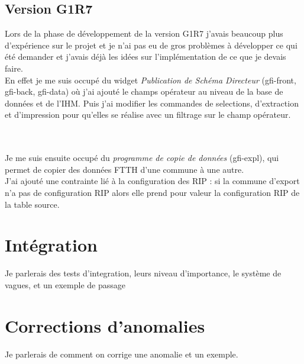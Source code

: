 \subsection{Version G1R7}
Lors de la phase de développement de la version G1R7 j'avais beaucoup plus d'expérience sur le projet et je n'ai pas eu de  gros problèmes à développer ce qui été demander et j'avais déjà les idées sur l'implémentation de ce que je devais faire.
\\En effet je me suis occupé du widget \textit{Publication de Schéma Directeur} (gfi-front, gfi-back, gfi-data) où j'ai ajouté le champs opérateur au niveau de la base de données et de l'IHM. Puis j'ai modifier les commandes de selections, d'extraction et d'impression pour qu'elles se réalise avec un filtrage sur le champ opérateur.
\\\\
\noindent%
\begin{minipage}{\linewidth}%
\label{visina8}%
\end{minipage}\\

Je me suis ensuite occupé du \textit{programme de copie de données} (gfi-expl), qui permet de copier des données FTTH d'une commune à une autre.
\\J'ai ajouté une contrainte lié à la configuration des RIP : si la commune d'export n'a pas de configuration RIP alors elle prend pour valeur la configuration RIP de la table source.

\section{Intégration}
Je parlerais des tests d'integration, leurs niveau d'importance, le système de vagues, et un exemple de passage
\section{Corrections d'anomalies}
Je parlerais de comment on corrige une anomalie et un exemple.

